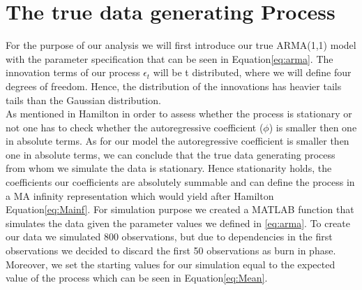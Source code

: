 \documentclass[12pt]{article}
\begin{document}
\section{The true data generating Process}
For the purpose of our analysis we will first introduce our true ARMA(1,1) model with the parameter specification that can be seen in Equation\eqref{eq:arma}.
The innovation terms of our process $\epsilon_t$ will be t distributed, where we will define four degrees of freedom. Hence, the distribution of the innovations has heavier tails tails than the Gaussian distribution.\\
As mentioned in Hamilton in order to assess whether the process is stationary or not one has to check  whether the autoregressive coefficient ($\phi$) is smaller then one in absolute terms. 
As for our model the autoregressive coefficient is smaller then one in absolute terms, we can conclude that the true data generating process from whom we simulate the data is stationary.
Hence stationarity holds, the coefficients our coefficients are absolutely summable and can define the process in a MA infinity representation which would yield after Hamilton Equation\eqref{eq:Mainf}.
For simulation purpose we created a MATLAB function that simulates the data given the parameter values we defined in \eqref{eq:arma}.
To create our data we simulated 800 observations, but due to dependencies in the first observations we decided to discard the first 50 observations as burn in phase. Moreover, we set the starting values for our simulation equal to the expected value of the process which can be seen in Equation\eqref{eq:Mean}.
\end{document}
